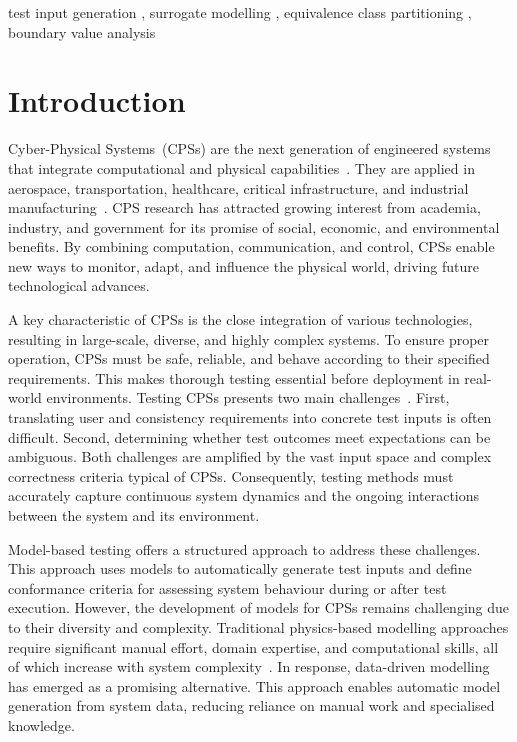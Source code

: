 \documentclass[
]{ceurart}
\theoremstyle{definition}
\begin{document}
\begin{keywords}
  test input generation \sep
  surrogate modelling \sep
  equivalence class partitioning \sep
  boundary value analysis
\end{keywords}

\maketitle

\section{Introduction}

Cyber-Physical Systems~(CPSs) are the next generation of engineered systems that integrate computational and physical capabilities~\cite{cpsdef}. They are applied in aerospace, transportation, healthcare, critical infrastructure, and industrial manufacturing~\cite{cpsapp}. CPS research has attracted growing interest from academia, industry, and government for its promise of social, economic, and environmental benefits. By combining computation, communication, and control, CPSs enable new ways to monitor, adapt, and influence the physical world, driving future technological advances.

A key characteristic of CPSs is the close integration of various technologies, resulting in large-scale, diverse, and highly complex systems. To ensure proper operation, CPSs must be safe, reliable, and behave according to their specified requirements. This makes thorough testing essential before deployment in real-world environments. Testing CPSs presents two main challenges~\cite{model}. First, translating user and consistency requirements into concrete test inputs is often difficult. Second, determining whether test outcomes meet expectations can be ambiguous. Both challenges are amplified by the vast input space and complex correctness criteria typical of CPSs. Consequently, testing methods must accurately capture continuous system dynamics and the ongoing interactions between the system and its environment.

Model-based testing offers a structured approach to address these challenges. This approach uses models to automatically generate test inputs and define conformance criteria for assessing system behaviour during or after test execution. However, the development of models for CPSs remains challenging due to their diversity and complexity. Traditional physics-based modelling approaches require significant manual effort, domain expertise, and computational skills, all of which increase with system complexity~\cite{flowcean}. In response, data-driven modelling has emerged as a promising alternative. This approach enables automatic model generation from system data, reducing reliance on manual work and specialised knowledge.
\end{document}

